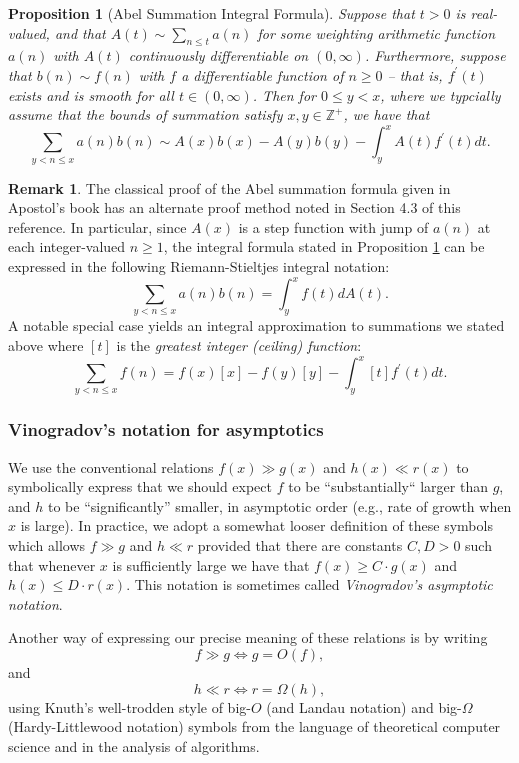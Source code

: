 \documentclass[11pt,reqno,a4letter]{article}
\numberwithin{figure}{section}
\numberwithin{table}{section}
\theoremstyle{plain}
\newtheorem{prop}[theorem]{Proposition}
\numberwithin{theorem}{section}
\theoremstyle{definition}
\newtheorem{remark}[theorem]{Remark}
\begin{document}
\begin{prop}[Abel Summation Integral Formula] 
\label{prop_AbelSummationFormula} 
Suppose that $t > 0$ is real-valued, and that $A(t) \sim \sum_{n \leq t} a(n)$ for some weighting 
arithmetic function $a(n)$ with $A(t)$ continuously differentiable on $(0, \infty)$. Furthermore, suppose that 
$b(n) \sim f(n)$ with $f$ a differentiable function of $n \geq 0$ -- that is, $f^{\prime}(t)$ exists and is smooth for all 
$t \in (0, \infty)$. 
Then for $0 \leq y < x$, where we typcially assume that the bounds of summation satisfy 
$x, y \in \mathbb{Z}^{+}$, we have that 
\[
\sum_{y < n \leq x} a(n) b(n) \sim A(x)b(x) - A(y)b(y) - \int_y^{x} A(t) f^{\prime}(t) dt. 
\] 
\end{prop}

\begin{remark}
The classical proof of the Abel summation formula given in Apostol's book has an alternate proof method 
noted in Section 4.3 of this reference. In particular, since $A(x)$ is a step function with jump of $a(n)$ 
at each integer-valued $n \geq 1$, the integral formula stated in 
Proposition \ref{prop_AbelSummationFormula} can be expressed in the following Riemann-Stieltjes integral 
notation: 
\[
\sum_{y < n \leq x} a(n) b(n) = \int_y^x f(t) dA(t). 
\]
A notable special case yields an integral approximation to summations we stated above where $[t]$ is the 
\emph{greatest integer (ceiling) function}: 
\[
\sum_{y < n \leq x} f(n) = f(x) [x] - f(y) [y] - \int_{y}^x [t] f^{\prime}(t) dt. 
\]
\end{remark}

\subsubsection{Vinogradov's notation for asymptotics} 

We use the conventional relations $f(x) \gg g(x)$ and $h(x) \ll r(x)$ to symbolically express that we should expect 
$f$ to be ``substantially`` larger than $g$, and $h$ to be ``significantly'' smaller, in asymptotic order 
(e.g., rate of growth when $x$ is large). In practice, we adopt a somewhat looser definition of these symbols which 
allows $f \gg g$ and $h \ll r$ provided that there are constants $C, D > 0$ such that whenever $x$ is sufficiently 
large we have that $f(x) \geq C \cdot g(x)$ and $h(x) \leq D \cdot r(x)$. This notation is sometimes called 
\emph{Vinogradov's asymptotic notation}. 

Another way of expressing our precise meaning of these relations is by writing 
$$f \gg g \iff g = O(f),$$ and $$h \ll r \iff r = \Omega(h),$$ using Knuth's well-trodden 
style of big-$O$ (and Landau notation) and big-$\Omega$ (Hardy-Littlewood notation)
symbols from the language of theoretical computer science and in the analysis of algorithms. 
\end{document}
